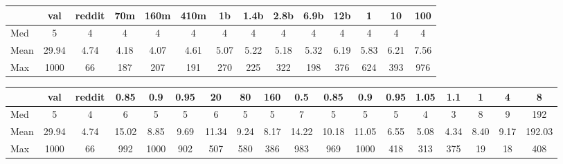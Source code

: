 \begin{tabular}{l|ccccccccccccc}
    \toprule
     & val & reddit & 70m & 160m & 410m & 1b & 1.4b & 2.8b & 6.9b & 12b & 1 & 10 & 100 \\
    \hline
    Med & 5 & 4 & 4 & 4 & 4 & 4 & 4 & 4 & 4 & 4 & 4 & 4 & 4 \\
    Mean & 29.94 & 4.74 & 4.18 & 4.07 & 4.61 & 5.07 & 5.22 & 5.18 & 5.32 & 6.19 & 5.83 & 6.21 & 7.56 \\
    Max & 1000 & 66 & 187 & 207 & 191 & 270 & 225 & 322 & 198 & 376 & 624 & 393 & 976 \\
    \bottomrule
\end{tabular}

\begin{tabular}{l|ccccccccccccccccc}
    \toprule
     & val & reddit & 0.85 & 0.9 & 0.95 & 20 & 80 & 160 & 0.5 & 0.85 & 0.9 & 0.95 & 1.05 & 1.1 & 1 & 4 & 8 \\
    \hline
    Med & 5 & 4 & 6 & 5 & 5 & 6 & 5 & 5 & 7 & 5 & 5 & 5 & 4 & 3 & 8 & 9 & 192 \\
    Mean & 29.94 & 4.74 & 15.02 & 8.85 & 9.69 & 11.34 & 9.24 & 8.17 & 14.22 & 10.18 & 11.05 & 6.55 & 5.08 & 4.34 & 8.40 & 9.17 & 192.03 \\
    Max & 1000 & 66 & 992 & 1000 & 902 & 507 & 580 & 386 & 983 & 969 & 1000 & 418 & 313 & 375 & 19 & 18 & 408 \\
    \bottomrule
\end{tabular}
